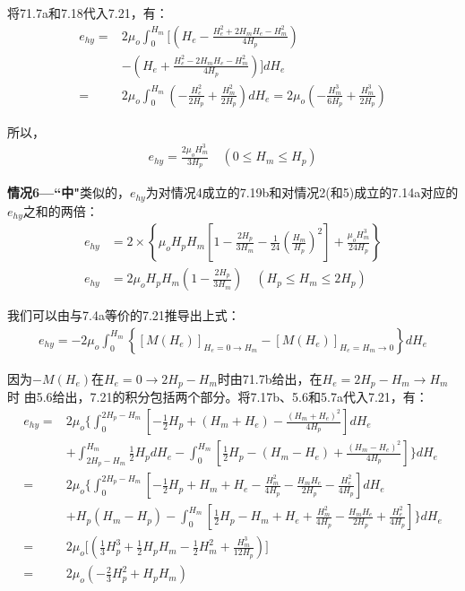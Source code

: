将71.7a和7.18代入7.21，有：
\begin{align*}%
e_{hy}=&2\mu_o\int_{0}^{H_m}\Big[\left(H_e-\frac{H_{e}^{2}+2H_mH_e-H_{m}^{2}}{4H_p}\right) \\
&-\left(H_e+\frac{H_{e}^{2}-2H_mH_e-H_{m}^{2}}{4H_p}\right)\Big]dH_e \\
=&2\mu_o\int_{0}^{H_m}\left(-\frac{H_{e}^{2}}{2H_p}+\frac{H_{m}^{2}}{2H_p}\right)dH_e=2\mu_o\left(-\frac{H_{m}^{3}}{6H_p}+\frac{H_{m}^{3}}{2H_p}\right)
\end{align*}

所以，
\begin{align*}
e_{hy}=\frac{2\mu_oH_{m}^{3}}{3H_p} \quad (0\leq H_m\leq H_p) \tag{7.20}
\end{align*}

\textbf{情况6---``中"}\quad 类似的，$e_{hy}$为对情况4成立的7.19b和对情况2(和5)成立的7.14a对应的$e_{hy}$之和的两倍：
\begin{align*}%
e_{hy}&=2\times\left\{\mu_oH_pH_m\left[1-\frac{2H_p}{3H_m}-\frac{1}{24}\left(\frac{H_m}{H_p}\right)^2\right]+\frac{\mu_oH_{m}^{3}}{24H_p}\right\}\\
e_{hy}&=2\mu_oH_pH_m\left(1-\frac{2H_p}{3H_m}\right)\quad (H_p\leq H_m\leq 2H_p) \tag{7.20b}
\end{align*}

我们可以由与7.4a等价的7.21推导出上式：
\begin{align*}%
e_{hy}=-2\mu_o\int_{0}^{H_m}\left\{[M(H_e)]_{H_e=0\rightarrow H_m}-[M(H_e)]_{H_e=H_m\rightarrow 0}\right\}dH_e \tag{7.21}
\end{align*}

因为$-M(H_e)$在$H_e=0\rightarrow 2H_p-H_m$时由71.7b给出，在$H_e=2H_p-H_m\rightarrow H_m$时
由5.6给出，7.21的积分包括两个部分。将7.17b、5.6和5.7a代入7.21，有：
\begin{align*}%
e_{hy}=&2\mu_o\{\int_{0}^{2H_p-H_m}\left[-\frac{1}{2}H_p+(H_m+H_e)-\frac{(H_m+H_e)^2}{4H_p}\right]dH_e \\
&+\int_{2H_p-H_m}^{H_m}\frac{1}{2}H_pdH_e-\int_{0}^{H_m}\left[\frac{1}{2}H_p-(H_m-H_e)+\frac{(H_m-H_e)^2}{4H_p}\right]\}dH_e\\
=&2\mu_o\Big\{\int_{0}^{2H_p-H_m}\left[-\frac{1}{2}H_p+H_m+H_e-\frac{H_{m}^{2}}{4H_p}-\frac{H_mH_e}{2H_p}-\frac{H_{e}^{2}}{4H_p}\right]dH_e \\
&+H_p(H_m-H_p)-\int_{0}^{H_m}\left[\frac{1}{2}H_p-H_m+H_e+\frac{H_{m}^{2}}{4H_p}-\frac{H_mH_e}{2H_p}+\frac{H_{e}^{2}}{4H_p}\right]\Big\}dH_e \\
=&2\mu_o\Big[\left(\frac{1}{3}H_{p}^{3}+\frac{1}{2}H_pH_m-\frac{1}{2}H_{m}^{2}+\frac{H_{m}^{3}}{12H_p}\right)\Big] \\
=&2\mu_o\left(-\frac{2}{3}H_{p}^{2}+H_pH_m\right) 
\end{align*}

